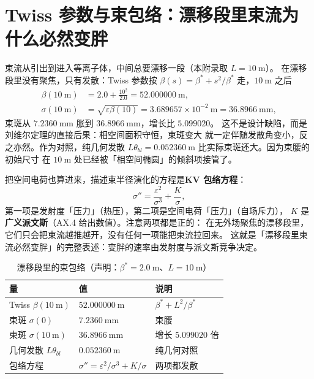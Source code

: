 \section{Twiss 参数与束包络：漂移段里束流为什么必然变胖}
\label{sec:app-ax-envelope}

束流从引出到进入等离子体，中间总要漂移一段（本附录取 $L=10\ \mathrm{m}$）。
在漂移段里没有聚焦，只有发散：Twiss 参数按 $\beta(s)=\beta^*+s^2/\beta^*$
走，$10\ \mathrm{m}$ 之后
\begin{equation}
\begin{aligned}
\beta(10\ \mathrm{m})&=2.0+\frac{10^2}{2.0}=52.000000\ \mathrm{m},\\
\sigma(10\ \mathrm{m})&=\sqrt{\varepsilon\beta(10)}=3.689657\times10^{-2}\ \mathrm{m}=36.8966\ \mathrm{mm},
\end{aligned}
\label{eq:app-ax-drift}
\end{equation}
束斑从 $7.2360\ \mathrm{mm}$ 胀到 $36.8966\ \mathrm{mm}$，增长比 $5.099020$。
这不是设计缺陷，而是刘维尔定理的直接后果：相空间面积守恒，束斑变大
就一定伴随发散角变小，反之亦然。作为对照，纯几何发散
$L\theta_{bl}=0.052360\ \mathrm{m}$ 比实际束斑还大。因为束腰的初始尺寸
在 $10\ \mathrm{m}$ 处已经被「相空间椭圆」的倾斜项接管了。

把空间电荷也算进来，描述束半径演化的方程是\textbf{KV 包络方程}：
\begin{equation}
\sigma''=\frac{\varepsilon^2}{\sigma^3}+\frac{K}{\sigma},
\label{eq:app-ax-kv}
\end{equation}
第一项是发射度「压力」（热压），第二项是空间电荷「压力」（自场斥力），
$K$ 是\textbf{广义派文斯}（AX.4 给出数值）。注意两项都是正的：
在无外场聚焦的漂移段里，它们只会把束流越推越开，没有任何一项能把束流拉回来。
这就是「漂移段里束流必然变胖」的完整表述：变胖的速率由发射度与派文斯竞争决定。

\begin{table}[htbp]
\centering
\small
\caption{漂移段里的束包络（声明：$\beta^*=2.0\ \mathrm{m}$、$L=10\ \mathrm{m}$）}
\label{tab:app-ax-envelope}
\begin{tabular}{p{5.0cm}p{4.2cm}p{4.0cm}}
\hline
量 & 值 & 说明 \\
\hline
Twiss $\beta(10\ \mathrm{m})$ & $52.000000\ \mathrm{m}$ & $\beta^*+L^2/\beta^*$ \\
束斑 $\sigma(0)$ & $7.2360\ \mathrm{mm}$ & 束腰 \\
束斑 $\sigma(10\ \mathrm{m})$ & $36.8966\ \mathrm{mm}$ & 增长 $5.099020$ 倍 \\
几何发散 $L\theta_{bl}$ & $0.052360\ \mathrm{m}$ & 纯几何对照 \\
包络方程 & $\sigma''=\varepsilon^2/\sigma^3+K/\sigma$ & 两项都发散 \\
\hline
\end{tabular}
\end{table}

